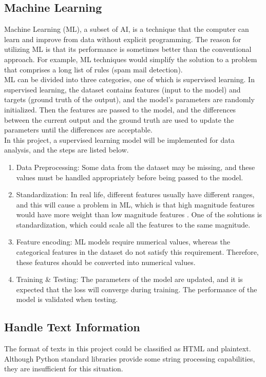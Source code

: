 \documentclass[12pt,twoside]{report}
\begin{document}
\subsection{Machine Learning}
Machine Learning (ML), a subset of AI, is a technique that the computer can learn and improve from data without explicit programming. The reason for utilizing ML is that its performance is sometimes better than the conventional approach. For example, ML techniques would simplify the solution to a problem that comprises a long list of rules (spam mail detection). 
\\

ML can be divided into three categories, one of which is supervised learning. In supervised learning, the dataset contains features (input to the model) and targets (ground truth of the output), and the model's parameters are randomly initialized. Then the features are passed to the model, and the differences between the current output and the ground truth are used to update the parameters until the differences are acceptable. 
\\

In this project, a supervised learning model will be implemented for data analysis, and the steps are listed below.
\begin{enumerate}
	\item Data Preprocessing: Some data from the dataset may be missing, and these values must be handled appropriately before being passed to the model. 
	\item Standardization: In real life, different features usually have different ranges, and this will cause a problem in ML, which is that high magnitude features would have more weight than low magnitude features \citep{RN4}. One of the solutions is standardization, which could scale all the features to the same magnitude.
	\item Feature encoding: ML models require numerical values, whereas the categorical features in the dataset do not satisfy this requirement. Therefore, these features should be converted into numerical values. 
	\item Training \& Testing: The parameters of the model are updated, and it is expected that the loss will converge during training. The performance of the model is validated when testing.
\end{enumerate}

\subsection{Handle Text Information}
The format of texts in this project could be classified as HTML and plaintext. Although Python standard libraries provide some string processing capabilities, they are insufficient for this situation. 
\end{document}
